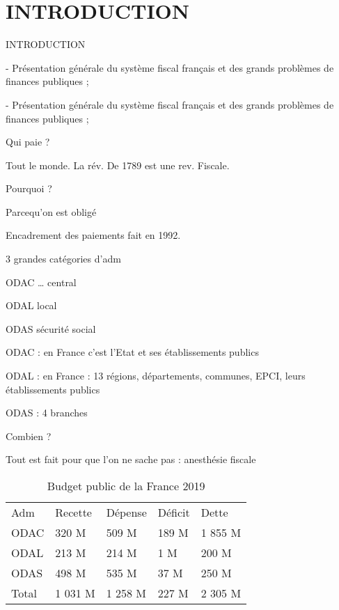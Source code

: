 
\chapter*{INTRODUCTION}


INTRODUCTION

-	Présentation générale du système fiscal français et des grands problèmes de finances publiques ;

-	Présentation générale du système fiscal français et des grands problèmes de finances publiques ;


Qui paie ?


Tout le monde. La rév. De 1789 est une rev. Fiscale.


Pourquoi ?


Parcequ’on est obligé

Encadrement des paiements fait en 1992.

3 grandes catégories d’adm

ODAC … central

ODAL local

ODAS sécurité social


ODAC : en France c’est l’Etat et ses établissements publics

ODAL : en France : 13 régions, départements, communes, EPCI, leurs établissements publics

ODAS : 4 branches


Combien ?

Tout est fait pour que l’on ne sache pas : anesthésie fiscale


\begin{table}
  \centering
  \begin{tabular}{lllll}
    Adm &	Recette	& Dépense	& Déficit	& Dette \\

    ODAC &	320 M	& 509 M	& 189 M	& 1 855 M \\

    ODAL	& 213 M	& 214 M	&1 M	& 200 M \\

    ODAS	& 498 M	& 535 M	& 37 M	& 250 M \\

    Total	& 1 031 M	& 1 258 M	& 227 M	& 2 305 M \\
  \end{tabular}
  \label{tab:budgetPublic}
  \caption{Budget public de la France 2019}

\end{table}


